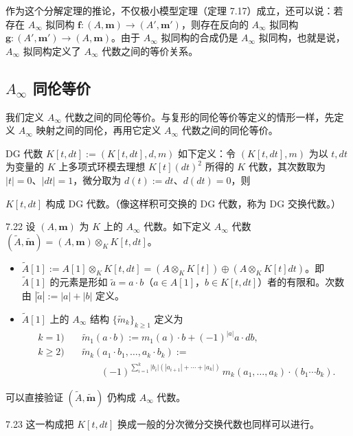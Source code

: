 作为这个分解定理的推论，不仅极小模型定理（定理 7.17）成立，还可以说：若存在 $A_\infty$ 拟同构 $\mathbf f\colon(A,\mathbf m)\to(A',\mathbf m')$，则存在反向的 $A_\infty$ 拟同构 $\mathbf g\colon(A',\mathbf m')\to(A,\mathbf m)$。由于 $A_\infty$ 拟同构的合成仍是 $A_\infty$ 拟同构，也就是说，$A_\infty$ 拟同构定义了 $A_\infty$ 代数之间的等价关系。

\subsection{$A_\infty$ 同伦等价}

我们定义 $A_\infty$ 代数之间的同伦等价。与复形的同伦等价等定义的情形一样，先定义 $A_\infty$ 映射之间的同伦，再用它定义 $A_\infty$ 代数之间的同伦等价。

DG 代数 $K[t,dt]:=(K[t,dt],d,m)$ 如下定义：令 $(K[t,dt],m)$ 为以 $t,dt$ 为变量的 $K$ 上多项式环模去理想 $K[t](dt)^{2}$ 所得的 $K$ 代数，其次数取为 $|t|=0$、$|dt|=1$，微分取为 $d(t):=dt$、$d(dt)=0$，则

$K[t,dt]$ 构成 DG 代数。（像这样积可交换的 DG 代数，称为 DG 交换代数。）

\begin{definition}{7.22}
设 $(A,\mathbf m)$ 为 $K$ 上的 $A_\infty$ 代数。如下定义 $A_\infty$ 代数 $(\tilde A,\tilde{\mathbf m})=(A,\mathbf m)\otimes_{K}K[t,dt]$。
\begin{itemize}[leftmargin=1.6em,itemsep=2pt,topsep=2pt]
  \item $\tilde A[1]:=A[1]\otimes_{K}K[t,dt]=(A\otimes_{K}K[t])\oplus(A\otimes_{K}K[t]dt)$。即 $\tilde A[1]$ 的元素是形如 $\tilde a=a\cdot b$（$a\in A[1]$，$b\in K[t,dt]$）者的有限和。次数由 $|\tilde a|:=|a|+|b|$ 定义。
  \item $\tilde A[1]$ 上的 $A_\infty$ 结构 $\{\tilde m_{k}\}_{k\ge 1}$ 定义为
  \begin{align*}
    k=1)\quad &\tilde m_{1}(a\cdot b):=m_{1}(a)\cdot b+(-1)^{|a|}a\cdot db,\\
    k\ge 2)\quad &\tilde m_{k}(a_{1}\cdot b_{1},\dots,a_{k}\cdot b_{k}):={}\\
    &\qquad (-1)^{\sum_{i=1}^{k}|b_{i}|(|a_{i+1}|+\cdots+|a_{k}|)}\,m_{k}(a_{1},\dots,a_{k})\cdot(b_{1}\cdots b_{k}).
  \end{align*}
\end{itemize}
\end{definition}

可以直接验证 $(\tilde A,\tilde{\mathbf m})$ 仍构成 $A_\infty$ 代数。

\begin{remark}{7.23}
这一构成把 $K[t,dt]$ 换成一般的分次微分交换代数也同样可以进行。
\end{remark}

